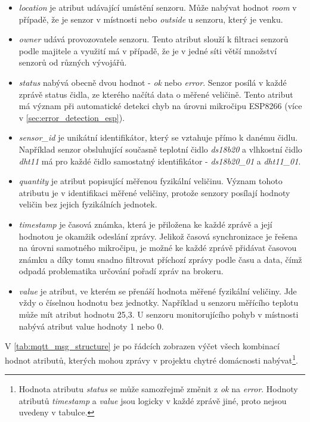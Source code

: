 \begin{itemize}
  \item \textit{location} je atribut udávající umístění senzoru. Může nabývat hodnot \textit{room} v případě, že je senzor v místnosti nebo \textit{outside} u senzoru, který je venku.
  \item \textit{owner} udává provozovatele senzoru. Tento atribut slouží k filtraci senzorů podle majitele a využití má v případě, že je v jedné síti větší množství senzorů od různých vývojářů.
  \item \textit{status} nabývá obecně dvou hodnot - \textit{ok} nebo \textit{error}. Senzor posílá v každé zprávě status čidla, ze kterého načítá data o měřené veličině. Tento atribut má význam při automatické detekci chyb na úrovni mikročipu ESP8266 (více v \cref{sec:error_detection_esp}). 
  \item \textit{sensor\_id} je unikátní identifikátor, který se vztahuje přímo k danému čidlu. Například senzor obsluhující současně teplotní čidlo \textit{ds18b20} a vlhkostní čidlo \textit{dht11} má pro každé čidlo samostatný identifikátor - \textit{ds18b20\_01} a \textit{dht11\_01}. 
  \item \textit{quantity} je atribut popisující měřenou fyzikální veličinu. Význam tohoto atributu je v identifikaci měřené veličiny, protože senzory posílají hodnoty veličin bez jejich fyzikálních jednotek.  
  \item \textit{timestamp} je časová známka, která je přiložena ke každé zprávě a její hodnotou je okamžik odeslání zprávy. Jelikož časová synchronizace je řešena na úrovni samotného mikročipu, je možné ke každé zprávě přidávat časovou známku a díky tomu snadno filtrovat příchozí zprávy podle času a data, čímž odpadá problematika určování pořadí zpráv na brokeru.   
  \item \textit{value} je atribut, ve kterém se přenáší hodnota měřené fyzikální veličiny. Jde vždy o číselnou hodnotu bez jednotky. Například u senzoru měřícího teplotu může mít atribut hodnotu 25,3. U senzoru monitorujícího pohyb v místnosti nabývá atribut value hodnoty 1 nebo 0.  
\end{itemize}

V \cref{tab:mqtt_msg_structure} je po řádcích zobrazen výčet všech kombinací hodnot atributů, kterých mohou zprávy v projektu chytré domácnosti nabývat\footnote{Hodnota atributu \textit{status} se může samozřejmě změnit z \textit{ok} na \textit{error}. Hodnoty atributů \textit{timestamp} a \textit{value} jsou logicky v každé zprávě jiné, proto nejsou uvedeny v tabulce.}.  

